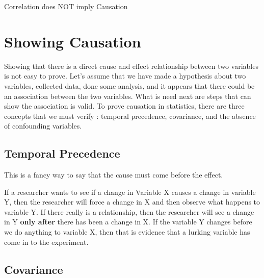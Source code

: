 \documentclass[
  letterpaper,
  DIV=11,
  numbers=noendperiod]{scrreprt}
\begin{document}
\begin{tcolorbox}[enhanced jigsaw, opacitybacktitle=0.6, coltitle=black, colframe=quarto-callout-important-color-frame, colback=white, left=2mm, bottomtitle=1mm, breakable, leftrule=.75mm, arc=.35mm, toptitle=1mm, title=\textcolor{quarto-callout-important-color}{\faExclamation}\hspace{0.5em}{Important}, opacityback=0, rightrule=.15mm, bottomrule=.15mm, titlerule=0mm, toprule=.15mm, colbacktitle=quarto-callout-important-color!10!white]

Correlation does NOT imply Causation

\end{tcolorbox}

\section*{Showing Causation}\label{showing-causation}


Showing that there is a direct cause and effect relationship between two
variables is not easy to prove. Let's assume that we have made a
hypothesis about two variables, collected data, done some analysis, and
it appears that there could be an association between the two variables.
What is need next are steps that can show the association is valid. To
prove causation in statistics, there are three concepts that we must
verify : temporal precedence, covariance, and the absence of confounding
variables.

\subsection*{Temporal Precedence}\label{temporal-precedence}

This is a fancy way to say that the cause must come before the effect.

If a researcher wants to see if a change in Variable X causes a change
in variable Y, then the researcher will force a change in X and then
observe what happens to variable Y. If there really is a relationship,
then the researcher will see a change in Y \textbf{only after} there has
been a change in X. If the variable Y changes before we do anything to
variable X, then that is evidence that a lurking variable has come in to
the experiment.

\subsection*{Covariance}\label{covariance}
\end{document}
